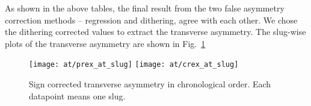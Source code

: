 \begin{comment}
    & 343.4 & 154.8 & 155.1
    & 379.9 & 91.0  & 91.4
    & 493.9 & 93.0  & 94.1
    & 345.4 & 152.9 & 153.0
    & 387.2 & 91.3  & 91.9
    & 495.3 & 93.5  & 95.3
    & 344.5 & 153.7 & 153.9
    & 383.6 & 91.2  & 91.7
    & 494.5 & 93.2  & 94.6


\begin{table}
    \scriptsize
    \begin{tabular}{c | c c c | c c c}
	\hline
	\multirow{2}{*}{Target}	& \multicolumn{3}{c|}{Minirun Average (ppm)} & \multicolumn{3}{c}{Mulplot (ppm)}	\\
	\cline{2-7}
	    & raw	& reg	& dit	& raw	& reg	& dit	\\
	\hline
	\multicolumn{7}{c}{IHWP IN}   \\
	\hline
	C	& 659.82  & 558.10  & 558.71  & 659.84  & 557.97  & 558.56	\\
	Ca40    & 933.96  & 717.96  & 719.28  & 933.69  & 718.04  & 719.32	\\
	Ca48    & 994.35  & 775.30  & 776.19  & 994.78  & 775.61  & 776.50	\\
	Pb	& 1262.78 & 1168.89 & 1170.02 & 1261.95 & 1168.23 & 1169.35	\\
	\hline
	\multicolumn{7}{c}{IHWP OUT}   \\
	\hline
	C	& 8607.92 & 1558.19	& 8789.05 & 1313.51	& 8791.48 & 1314.60	 \\
	Ca40    & 8023.61 & 1751.48	& 7967.37 & 1353.29	& 7994.17 & 1355.00	 \\
	Ca48    & 7267.11 & 1516.31	& 8257.84 & 1180.23	& 8254.72 & 1183.33	 \\
	Pb	& 2089.10 & 2456.43	& 2420.15 & 2263.44	& 2456.87 & 2266.23	 \\
	\hline
	\multicolumn{7}{c}{COMBINED}   \\
	\hline
	C	& 661.92  & 558.72  & 559.27  & 661.73  & 558.75  & 559.29	\\
	Ca40    & 932.99  & 718.38  & 719.52  & 932.93  & 718.36  & 719.47	\\
	Ca48    & 996.46  & 775.93  & 777.46  & 996.67  & 776.15  & 777.63	\\
	Pb	& 1260.29 & 1163.94 & 1165.22 & 1259.54 & 1163.30 & 1164.57	\\
	\hline
    \end{tabular}
    \caption{Mini-wise average and mulplot average values for each target}
\end{table}
\end{comment}
As shown in the above tables, the final result from the two false asymmetry 
correction methods -- regression and dithering, agree with each other.
We chose the dithering corrected values to extract the transverse asymmetry.	%
The slug-wise plots of the transverse asymmetry are shown in Fig.~\ref{fig:AT_slug} 
\begin{figure}[!h]
    \centering
    \texttt{[image: at/prex\_at\_slug]}
    \texttt{[image: at/crex\_at\_slug]}
    \caption{Sign corrected transverse asymmetry in chronological order. 
    Each datapoint means one slug.}
    \label{fig:AT_slug}
\end{figure}

